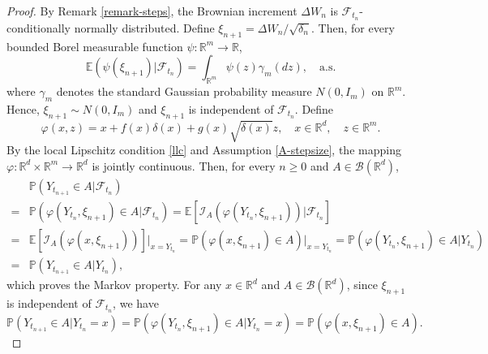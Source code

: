 \documentclass[preprint,12pt,compress]{elsarticle}
\begin{document}
\begin{proof}	
By Remark \ref{remark-steps}, the Brownian increment $\Delta W_n$ is $\mathcal{F}_{t_n}$-conditionally normally distributed. Define $\xi_{n+1} = \Delta W_n /\sqrt{\delta_n}$. Then, for every bounded Borel measurable function $\psi : \mathbb{R}^m \to \mathbb{R}$,
\begin{equation*}
	\mathbb{E}\left( {\psi ({\xi _{n + 1}})|{\mathcal{F}_{{t_n}}}} \right) = \int_{{\mathbb{R}^m}} {\psi (z){\gamma _m}(dz)} ,\quad \text{a.s.}
\end{equation*}
where $\gamma_m$ denotes the standard Gaussian probability measure $N(0, I_m)$ on $\mathbb{R}^m$. Hence, ${\xi _{n + 1}} \sim N(0,{I_m})$ and $\xi_{n+1}$ is independent of $\mathcal{F}_{t_n}$. 
Define 
\begin{equation*}
	\varphi (x,z) = x + f(x)\delta (x) + g(x)\sqrt {\delta (x)} z, \quad x \in \mathbb{R}^d, \quad z \in \mathbb{R}^m.
\end{equation*}
By the local Lipschitz condition \eqref{llc} and Assumption \ref{A-stepsize}, the mapping $\varphi:\mathbb{R}^d \times \mathbb{R}^m \to \mathbb{R}^d$ is jointly continuous. Then,
for every $n \ge 0$ and $A \in \mathcal{B}(\mathbb{R}^d)$,
	\begin{equation}  \label{op1}
		\begin{split}
			&\mathbb{P}\left( {{Y_{{t_{n + 1}}}} \in A|{\mathcal{F}_{{t_n}}}} \right) \\
			=& \mathbb{P}\left( {\varphi ({Y_{{t_n}}},{\xi _{n + 1}}) \in A|{\mathcal{F}_{{t_n}}}} \right) = \mathbb{E}\left[ {{\mathcal{I}_A}(\varphi ({Y_{{t_n}}},{\xi _{n + 1}}))|{\mathcal{F}_{{t_n}}}} \right] \\
			=& \mathbb{E}\left[ {{\mathcal{I}_A}(\varphi (x,{\xi _{n + 1}}))} \right]{|_{x = {Y_{{t_n}}}}} = \mathbb{P}\left( {\varphi (x,{\xi _{n + 1}}) \in A} \right){|_{x = {Y_{{t_n}}}}} = \mathbb{P}\left( {\varphi ({Y_{{t_n}}},{\xi _{n + 1}}) \in A|{Y_{{t_n}}}} \right) \\
			=& \mathbb{P}\left( {{Y_{{t_{n + 1}}}} \in A|{Y_{{t_n}}}} \right) ,
		\end{split}
	\end{equation}
which proves the Markov property. For any $x \in \mathbb{R}^d$ and $A \in \mathcal{B}(\mathbb{R}^d)$, since $\xi_{n+1}$ is independent of $\mathcal{F}_{t_n}$, we have
\begin{equation}  \label{pq9}
	\mathbb{P}\left( {{Y_{{t_{n + 1}}}} \in A|{Y_{{t_n}}} = x } \right) = \mathbb{P}\left( {\varphi ({Y_{{t_n}}},{\xi _{n + 1}}) \in A|{Y_{{t_n}}} = x } \right) = \mathbb{P}\left( {\varphi (x ,{\xi _{n + 1}}) \in A} \right).

\end{equation}
\end{proof}
\end{document}
